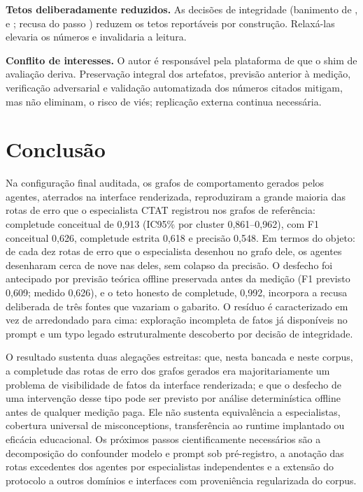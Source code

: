 \documentclass[11pt,a4paper]{article}
\begin{document}
\textbf{Tetos deliberadamente reduzidos.} As decisões de integridade (banimento de ,  e ; recusa do passo ) reduzem os tetos reportáveis por construção. Relaxá-las elevaria os números e invalidaria a leitura.

\textbf{Conflito de interesses.} O autor é responsável pela plataforma de que o shim de avaliação deriva. Preservação integral dos artefatos, previsão anterior à medição, verificação adversarial e validação automatizada dos números citados mitigam, mas não eliminam, o risco de viés; replicação externa continua necessária.

\section{Conclusão}

Na configuração final auditada, os grafos de comportamento gerados pelos agentes, aterrados na interface renderizada, reproduziram a grande maioria das rotas de erro que o especialista CTAT registrou nos grafos de referência: completude conceitual de 0,913 (IC95\% por cluster 0,861--0,962), com F1 conceitual 0,626, completude estrita 0,618 e precisão 0,548. Em termos do objeto: de cada dez rotas de erro que o especialista desenhou no grafo dele, os agentes desenharam cerca de nove nas deles, sem colapso da precisão. O desfecho foi antecipado por previsão teórica offline preservada antes da medição (F1 previsto 0,609; medido 0,626), e o teto honesto de completude, 0,992, incorpora a recusa deliberada de três fontes que vazariam o gabarito. O resíduo é caracterizado em vez de arredondado para cima: exploração incompleta de fatos já disponíveis no prompt e um typo legado estruturalmente descoberto por decisão de integridade.

O resultado sustenta duas alegações estreitas: que, nesta bancada e neste corpus, a completude das rotas de erro dos grafos gerados era majoritariamente um problema de visibilidade de fatos da interface renderizada; e que o desfecho de uma intervenção desse tipo pode ser previsto por análise determinística offline antes de qualquer medição paga. Ele não sustenta equivalência a especialistas, cobertura universal de misconceptions, transferência ao runtime implantado ou eficácia educacional. Os próximos passos cientificamente necessários são a decomposição do confounder modelo e prompt sob pré-registro, a anotação das rotas excedentes dos agentes por especialistas independentes e a extensão do protocolo a outros domínios e interfaces com proveniência regularizada do corpus.
\end{document}
